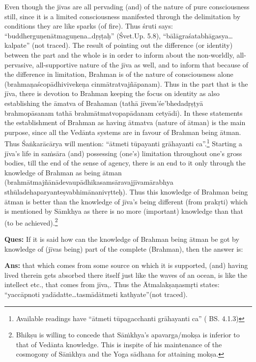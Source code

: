 Even though the jīvas are all pervading (and) of the nature of pure consciousness still, since it is a limited consciousness manifested through the delimitation by conditions they are like sparks (of fire). Thus śruti says: “buddherguṇenātmaguṇena…dṛṣṭaḥ” (Śvet.Up. 5.8), “bālāgra\-śatabhāgasya…kalpate” (not traced). The result of pointing out the difference (or identity) between the part and the whole is in order to inform about the non-worldly, all-pervasive, all-supportive nature of the jīva as well, and to inform that because of the difference in limitation, Brahman is of the nature of consciousness alone (brahmaṇaścopādhivivekeṇa cinmātratvajñāpanam). Thus in the part that is the jīva, there is devotion to Brahman keeping the focus on identity as also establishing the āmatva of Brahaman (tathā jīvem’śe’bhedadṛṣṭyā brahmopāsanam tathā brahmātmatvopapādanam cetyādi). In these statements the  establishment of Brahman as having ātmatva (nature of ātman) is the main purpose, since all the Vedānta systems are in favour of Brahman being ātman. Thus Śaṅkarācārya  will mention: “ātmeti tūpayanti grāhayanti ca”.\footnote{Available readings have “ātmeti tūpagacchanti grāhayanti ca” ( BS. 4.1.3)}   Starting a jīva’s life in saṁsāra (and) possessing (one’s) limitation throughout one’s gross bodies, till the end of the sense of agency, there is an end to it only through the knowledge of Brahman as being ātman (brahmātmajñānādevaupādhikasamsāravajjīvamārabhya sthūladehaparyanteṣvabhimānanivṛtteḥ). Thus this knowledge of Brahman being ātman is better than the knowledge of jīva’s being different (from prakṛti) which is mentioned by Sāmkhya as there is no more (important) knowledge than that (to be achieved).\footnote{Bhikṣu is willing to concede that Sāṁkhya’s apavarga/mokṣa is inferior to that of Vedānta knowledge. This is inspite of his maintenance of the cosmogony of Sāṁkhya and the Yoga sādhana for attaining mokṣa.}  

\textbf{Ques:} If it is said how can the knowledge of Brahman being ātman be got by knowledge of (jīvas being) part of the complete (Brahman), then the answer is:

\textbf{Ans:} that which comes from some source on which it is supported, (and) having lived therein gets absorbed there itself just like the waves of an ocean, is like the intellect etc., that comes from jīva,. Thus the Ātmalakṣaṇasmṛti states: “yaccāpnoti yadādatte…tasmādātmeti kathyate”(not traced).

